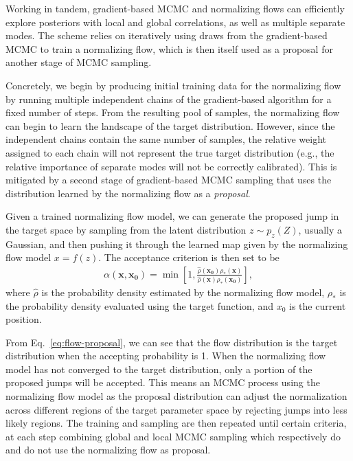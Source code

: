 \documentclass[twocolumn]{aastex631}
\begin{document}
Working in tandem, gradient-based MCMC and normalizing flows can efficiently
explore posteriors with local and global correlations, as well as multiple
separate modes.  The scheme relies on iteratively using draws from the
gradient-based MCMC to train a normalizing flow, which is then itself used as a
proposal for another stage of MCMC sampling.

Concretely, we begin by producing initial training data for the normalizing
flow by running multiple independent chains of the gradient-based algorithm for
a fixed number of steps.  From the resulting pool of samples, the normalizing
flow can begin to learn the landscape of the target distribution.
However, since the independent chains contain the same number of samples, the
relative weight assigned to each chain will not represent the true target
distribution (e.g., the relative importance of separate modes will not be
correctly calibrated). This is mitigated by a second stage of gradient-based
MCMC sampling that uses the distribution learned by the normalizing flow as a
\textit{proposal}.

Given a trained normalizing flow model, we can generate the proposed jump in
the target space by sampling from the latent distribution $z \sim p_z(Z)$,
usually a Gaussian, and then pushing it through the learned map given by the
normalizing flow model $x=f(z)$.  The acceptance criterion is then set to be
\begin{align} \label{eq:flow-proposal}
    \alpha(\mathbf{x},\mathbf{x_0}) = \min \left[ 1, \frac{\hat{\rho}(\mathbf{x_0})\rho_*(\mathbf{x})}{\hat{\rho}(\mathbf{x})\rho_*(\mathbf{x_0})}\right],
\end{align}
where $\hat{\rho}$ is the probability density estimated by the normalizing flow
model, $\rho_*$ is the probability density evaluated using the target function,
and $x_0$ is the current position.

From Eq.~\eqref{eq:flow-proposal}, we can see that the flow distribution is the
target distribution when the accepting probability is 1. When the normalizing
flow model has not converged to the target distribution, only a portion of the
proposed jumps will be accepted. This means an MCMC process using the
normalizing flow model as the proposal distribution can adjust the
normalization across different regions of the target parameter space by
rejecting jumps into less likely regions. The training and sampling are then
repeated until certain criteria, at each step combining global and local MCMC
sampling which respectively do and do not use the normalizing flow as proposal.
\end{document}
